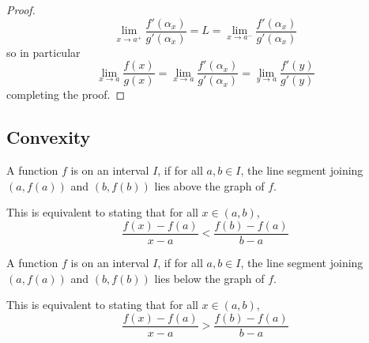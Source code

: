 \documentclass[12pt, a4paper, oneside, openright, titlepage]{book}
\begin{document}
\begin{proof}
\begin{equation*}
        \lim\limits_{x\rightarrow a^+} \frac{f'(\alpha_x)}{g'(\alpha_x)} = L = \lim\limits_{x\rightarrow a^-} \frac{f'(\alpha_x)}{g'(\alpha_x)} 
    \end{equation*}
    so in particular \begin{equation*}
        \lim\limits_{x\rightarrow a} \frac{f(x)}{g(x)} = \lim\limits_{x\rightarrow a} \frac{f'(\alpha_x)}{g'(\alpha_x)} =  \lim\limits_{y\rightarrow a} \frac{f'(y)}{g'(y)}
    \end{equation*}
    completing the proof.
\end{proof}


\subsection{Convexity}


\begin{defn}
    A function $f$ is  on an interval $I$, if for all $a,b \in I$, the line segment joining $(a,f(a))$ and $(b,f(b))$ lies above the graph of $f$.

    This is equivalent to stating that for all $x \in (a,b)$, \begin{equation}
        \frac{f(x) - f(a)}{x-a} < \frac{f(b) - f(a)}{b-a}
    \end{equation}
\end{defn}


\begin{defn}
    A function $f$ is  on an interval $I$, if for all $a,b \in I$, the line segment joining $(a,f(a))$ and $(b,f(b))$ lies below the graph of $f$.

    This is equivalent to stating that for all $x \in (a,b)$, \begin{equation}
        \frac{f(x) - f(a)}{x-a} > \frac{f(b) - f(a)}{b-a}
    \end{equation}
\end{defn}
\end{document}
